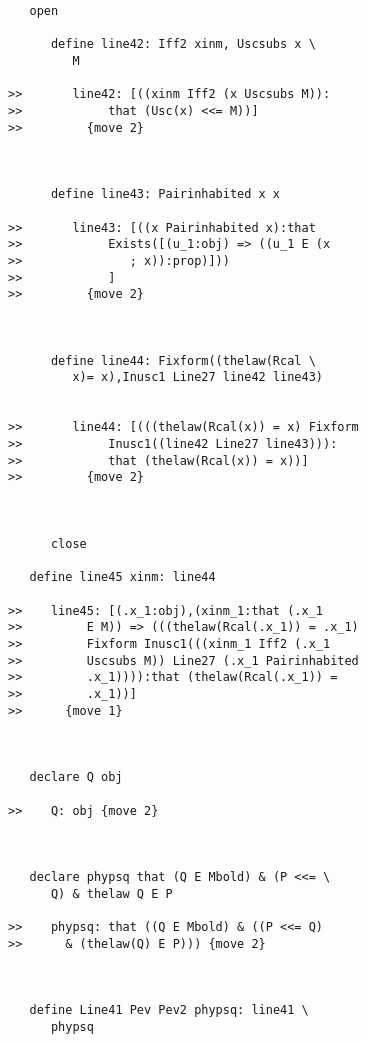 \documentclass[12pt]{article}
\begin{document}
\begin{verbatim}
   open

      define line42: Iff2 xinm, Uscsubs x \
         M

>>       line42: [((xinm Iff2 (x Uscsubs M)):
>>            that (Usc(x) <<= M))]
>>         {move 2}



      define line43: Pairinhabited x x

>>       line43: [((x Pairinhabited x):that
>>            Exists([(u_1:obj) => ((u_1 E (x
>>               ; x)):prop)]))
>>            ]
>>         {move 2}



      define line44: Fixform((thelaw(Rcal \
         x)= x),Inusc1 Line27 line42 line43)


>>       line44: [(((thelaw(Rcal(x)) = x) Fixform
>>            Inusc1((line42 Line27 line43))):
>>            that (thelaw(Rcal(x)) = x))]
>>         {move 2}



      close

   define line45 xinm: line44

>>    line45: [(.x_1:obj),(xinm_1:that (.x_1
>>         E M)) => (((thelaw(Rcal(.x_1)) = .x_1)
>>         Fixform Inusc1(((xinm_1 Iff2 (.x_1
>>         Uscsubs M)) Line27 (.x_1 Pairinhabited
>>         .x_1)))):that (thelaw(Rcal(.x_1)) =
>>         .x_1))]
>>      {move 1}



   declare Q obj

>>    Q: obj {move 2}



   declare phypsq that (Q E Mbold) & (P <<= \
      Q) & thelaw Q E P

>>    phypsq: that ((Q E Mbold) & ((P <<= Q)
>>      & (thelaw(Q) E P))) {move 2}



   define Line41 Pev Pev2 phypsq: line41 \
      phypsq


\end{verbatim}
\end{document}
